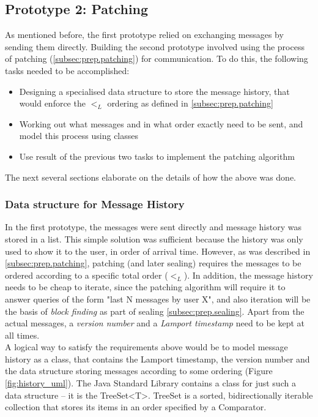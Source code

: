 \documentclass[a4paper, 12pt]{report}
\begin{document}
\subsection{Prototype 2: Patching}
As mentioned before, the first prototype relied on exchanging messages by sending them directly. Building the second prototype involved using the process of patching (\cref{subsec:prep.patching}) for communication. To do this, the following tasks needed to be accomplished:
\begin{itemize}
    \item Designing a specialised data structure to store the message history, that would enforce the $<_L$ ordering as defined in \cref{subsec:prep.patching}
    \item Working out what messages and in what order exactly need to be sent, and model this process using classes
    \item Use result of the previous two tasks to implement the patching algorithm
\end{itemize}
The next several sections elaborate on the details of how the above was done.

\subsubsection{Data structure for Message History}
In the first prototype, the messages were sent directly and message history was stored in a list. This simple solution was sufficient because the history was only used to show it to the user, in order of arrival time. However, as was described in \cref{subsec:prep.patching}, patching (and later sealing) requires the messages to be ordered according to a specific total order ($<_L$). In addition, the message history needs to be cheap to iterate, since the patching algorithm will require it to answer queries of the form "last N messages by user X", and also iteration will be the basis of \emph{block finding} as part of sealing \cref{subsec:prep.sealing}. Apart from the actual messages, a \emph{version number} and a \emph{Lamport timestamp} need to be kept at all times. \\

A logical way to satisfy the requirements above would be to model message history as a class, that contains the Lamport timestamp, the version number and the data structure storing messages according to some ordering (Figure \ref{fig:history_uml}). The Java Standard Library contains a class for just such a data structure -- it is the TreeSet<T>. TreeSet is a sorted, bidirectionally iterable collection that stores its items in an order specified by a Comparator.
\end{document}
